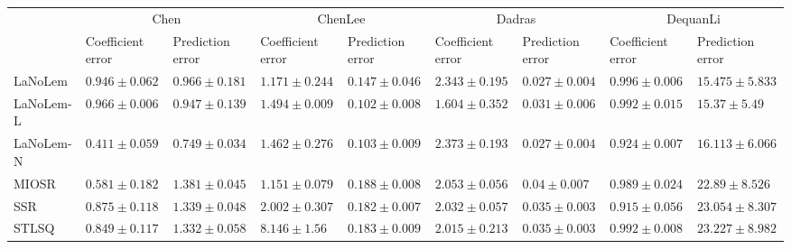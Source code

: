 \begin{table*}
{\begin{tabular}{lllllllll}
 & \multicolumn{2}{c}{Chen} & \multicolumn{2}{c}{ChenLee} & \multicolumn{2}{c}{Dadras} & \multicolumn{2}{c}{DequanLi} \\
 & Coefficient error & Prediction error & Coefficient error & Prediction error & Coefficient error & Prediction error & Coefficient error & Prediction error \\
\midrule
LaNoLem & $0.946\pm 0.062$ & $0.966\pm 0.181$ & $1.171\pm 0.244$ & $0.147\pm 0.046$ & $2.343\pm 0.195$ & $0.027\pm 0.004$ & $0.996\pm 0.006$ & $15.475\pm 5.833$ \\
LaNoLem-L & $0.966\pm 0.006$ & $0.947\pm 0.139$ & $1.494\pm 0.009$ & $\mathbf{0.102}\pm 0.008$ & $\mathbf{1.604}\pm 0.352$ & $0.031\pm 0.006$ & $0.992\pm 0.015$ & $\mathbf{15.37}\pm 5.49$ \\
LaNoLem-N & $\mathbf{0.411}\pm 0.059$ & $\mathbf{0.749}\pm 0.034$ & $1.462\pm 0.276$ & $0.103\pm 0.009$ & $2.373\pm 0.193$ & $\mathbf{0.027}\pm 0.004$ & $0.924\pm 0.007$ & $16.113\pm 6.066$ \\
MIOSR & $0.581\pm 0.182$ & $1.381\pm 0.045$ & $\mathbf{1.151}\pm 0.079$ & $0.188\pm 0.008$ & $2.053\pm 0.056$ & $0.04\pm 0.007$ & $0.989\pm 0.024$ & $22.89\pm 8.526$ \\
SSR & $0.875\pm 0.118$ & $1.339\pm 0.048$ & $2.002\pm 0.307$ & $0.182\pm 0.007$ & $2.032\pm 0.057$ & $0.035\pm 0.003$ & $\mathbf{0.915}\pm 0.056$ & $23.054\pm 8.307$ \\
STLSQ & $0.849\pm 0.117$ & $1.332\pm 0.058$ & $8.146\pm 1.56$ & $0.183\pm 0.009$ & $2.015\pm 0.213$ & $0.035\pm 0.003$ & $0.992\pm 0.008$ & $23.227\pm 8.982$ \\

\midrule


\end{tabular}}
\end{table*}
